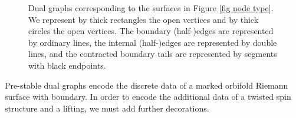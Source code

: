 \documentclass[11pt,a4paper]{article}
\theoremstyle{definition}
\theoremstyle{remark}
\numberwithin{equation}{section}
\begin{document}
\begin{figure}[h]
\begin{subfigure}{.3\textwidth}
\vspace{-0.2cm}

  \caption{}
\end{subfigure}
\begin{subfigure}{.3\textwidth}
  \centering

\vspace{0.3cm}

  \caption{}
\end{subfigure}
\caption{Dual graphs corresponding to the surfaces in Figure \ref{fig node type}. We represent by thick rectangles the open vertices and by thick circles the open vertices. The boundary (half-)edges are represented by ordinary lines, the  internal (half-)edges are represented by double lines, and the contracted boundary tails are represented by  segments with black endpoints.}
\label{fig dual graph}
\end{figure}


Pre-stable dual graphs encode the discrete data of a marked orbifold Riemann surface with boundary.  In order to encode the additional data of a twisted spin structure and a lifting, we must add further decorations.
\end{document}
